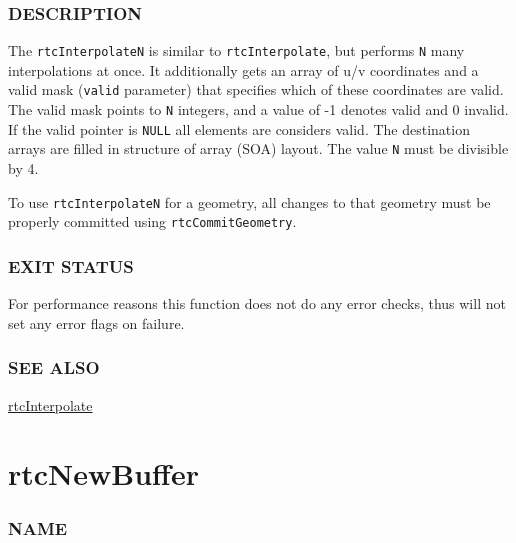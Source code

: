 \subsubsection{DESCRIPTION}\label{description}

The \texttt{rtcInterpolateN} is similar to \texttt{rtcInterpolate}, but
performs \texttt{N} many interpolations at once. It additionally gets an
array of u/v coordinates and a valid mask (\texttt{valid} parameter)
that specifies which of these coordinates are valid. The valid mask
points to \texttt{N} integers, and a value of -1 denotes valid and 0
invalid. If the valid pointer is \texttt{NULL} all elements are
considers valid. The destination arrays are filled in structure of array
(SOA) layout. The value \texttt{N} must be divisible by 4.

To use \texttt{rtcInterpolateN} for a geometry, all changes to that
geometry must be properly committed using \texttt{rtcCommitGeometry}.

\subsubsection{EXIT STATUS}\label{exit-status}

For performance reasons this function does not do any error checks, thus
will not set any error flags on failure.

\subsubsection{SEE ALSO}\label{see-also}

\hyperref[rtcinterpolate]{rtcInterpolate}

\pagebreak

\section{rtcNewBuffer}\label{rtcnewbuffer}

\subsubsection{NAME}\label{name}

\begin{Shaded}
\begin{Highlighting}[]
\OperatorTok{{-}}
\end{Highlighting}
\end{Shaded}

